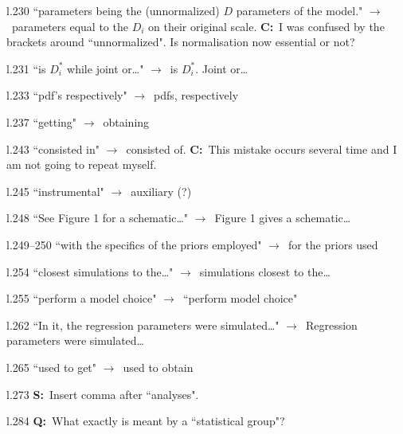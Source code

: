 \documentclass[11pt]{article}
\newenvironment{my_description}
{\begin{description}
  \setlength{\itemsep}{2pt}
  \setlength{\parskip}{0pt}
  \setlength{\parsep}{0pt}}
{\end{description}}
\newcommand{\ra}{$\rightarrow$\ }
\newcommand{\C}{\textbf{C:}\ }
\newcommand{\Q}{\textbf{Q:}\ }
\newcommand{\V}{\textbf{S:}\ }
\begin{document}
\begin{my_description}
	\item[l.230] ``parameters being the (unnormalized) $D$ parameters of the model." \ra parameters equal to the $D_i$ on their original scale. \C I was confused by the brackets around ``unnormalized". Is normalisation now essential or not?
	\item[l.231] ``is $D_i^{\ast}$ while joint or\dots" \ra is $D_i^{\ast}$. Joint or\dots
	\item[l.233] ``pdf's respectively" \ra pdfs, respectively
	\item[l.237] ``getting" \ra obtaining
	\item[l.243] ``consisted in" \ra consisted of. \C This mistake occurs several time and I am not going to repeat myself.
	\item[l.245] ``instrumental" \ra auxiliary (?)
	\item[l.248] ``See Figure 1 for a schematic\dots" \ra Figure 1 gives a schematic\dots
	\item[l.249--250] ``with the specifics of the priors employed" \ra for the priors used
	\item[l.254] ``closest simulations to the\dots" \ra simulations closest to the\dots
	\item[l.255] ``perform a model choice" \ra ``perform model choice"
	\item[l.262] ``In it, the regression parameters were simulated\dots" \ra Regression parameters were simulated\dots
	\item[l.265] ``used to get" \ra used to obtain
	\item[l.273] \V Insert comma after ``analyses".
	\item[l.284] \Q What exactly is meant by a ``statistical group"?
\end{my_description}
\end{document}
